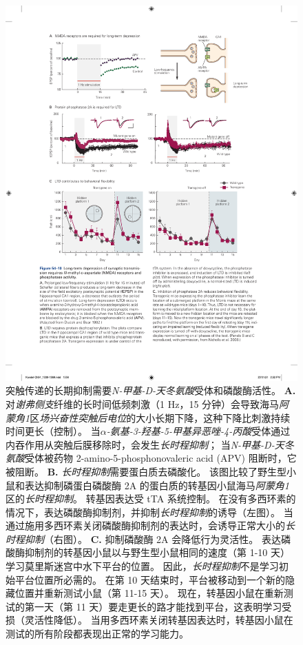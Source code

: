 \begin{figure}[htbp]
	\centering
	\includegraphics[width=0.95\linewidth]{chap54/fig_54_10}
	\caption{突触传递的长期抑制需要\textit{N-甲基-D-天冬氨酸}受体和磷酸酶活性。
		\textbf{A.} 对\textit{谢弗侧支}纤维的长时间低频刺激（1 Hz，15 分钟）会导致海马\textit{阿蒙角1}区\textit{场兴奋性突触后电位}的大小长期下降，这种下降比刺激持续时间更长（控制）。
		当\textit{$\alpha$-氨基-3-羟基-5-甲基异恶唑-4-丙酸}受体通过内吞作用从突触后膜移除时，会发生\textit{长时程抑制}；
		当\textit{N-甲基-D-天冬氨酸}受体被药物 2-amino-5-phosphonovaleric acid (APV) 阻断时，它被阻断\cite{dudek1992homosynaptic}。
		\textbf{B.} \textit{长时程抑制}需要蛋白质去磷酸化。
		该图比较了野生型小鼠和表达抑制磷蛋白磷酸酶 2A 的蛋白质的转基因小鼠海马\textit{阿蒙角1}区的\textit{长时程抑制}。
		转基因表达受 tTA 系统控制。
		在没有多西环素的情况下，表达磷酸酶抑制剂，并抑制\textit{长时程抑制}的诱导（左图）。
		当通过施用多西环素关闭磷酸酶抑制剂的表达时，会诱导正常大小的\textit{长时程抑制}（右图）。
		\textbf{C.} 抑制磷酸酶 2A 会降低行为灵活性。
		表达磷酸酶抑制剂的转基因小鼠以与野生型小鼠相同的速度（第 1-10 天）学习莫里斯迷宫中水下平台的位置。
		因此，\textit{长时程抑制}不是学习初始平台位置所必需的。
		在第 10 天结束时，平台被移动到一个新的隐藏位置并重新测试小鼠（第 11-15 天）。
		现在，转基因小鼠在重新测试的第一天（第 11 天）要走更长的路才能找到平台，这表明学习受损（灵活性降低）。
		当用多西环素关闭转基因表达时，转基因小鼠在测试的所有阶段都表现出正常的学习能力\cite{nicholls2008transgenic}。}
	\label{fig:54_10}
\end{figure}


